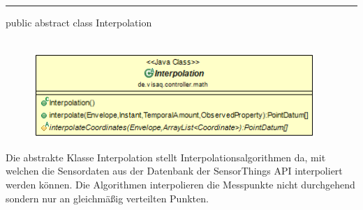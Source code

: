 \clearpage %
\rule{\textwidth}{0.4pt}
public abstract class Interpolation
\\\\
\begin{minipage}{0.5\textwidth}
    \begin{figure}[H]
        {\centering\includegraphics[width=0.95\textwidth]{media/backend/controller/classes/Interpolation.png}}
    \end{figure}
    \end{minipage} \hfill
\begin{minipage}{0.5\textwidth}
    Die abstrakte Klasse Interpolation stellt Interpolationsalgorithmen da, mit welchen die Sensordaten aus der Datenbank der \gls{SensorThings API} interpoliert werden können.
    Die Algorithmen interpolieren die Messpunkte nicht durchgehend sondern nur an gleichmäßig verteilten Punkten.
\end{minipage}

